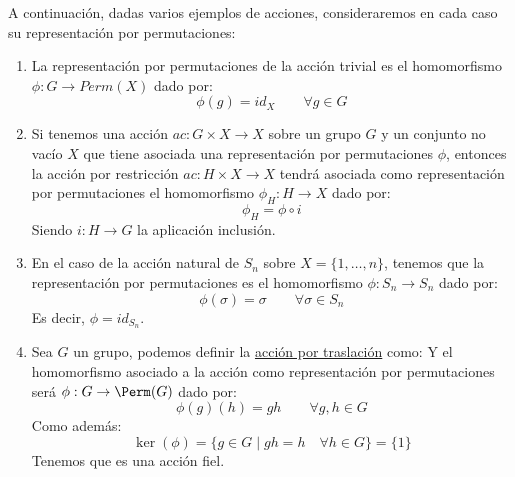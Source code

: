 \begin{ejemplo}
    A continuación, dadas varios ejemplos de acciones, consideraremos en cada caso su representación por permutaciones:
    \begin{enumerate}
        \item La representación por permutaciones de la acción trivial es el homomorfismo $\phi:G\to Perm(X)$ dado por:
            \begin{equation*}
                \phi(g) = id_X \qquad \forall g\in G
            \end{equation*}
        \item Si tenemos una acción $ac:G\times X\to X$ sobre un grupo $G$ y un conjunto no vacío $X$ que tiene asociada una representación por permutaciones $\phi$, entonces la acción por restricción $ac:H\times X\to X$ tendrá asociada como representación por permutaciones el homomorfismo $\phi_H:H\to X$ dado por:
            \begin{equation*}
                \phi_H = \phi \circ i 
            \end{equation*}
            Siendo $i:H\to G$ la aplicación inclusión.
        \item En el caso de la acción natural de $S_n$ sobre $X =\{1,\ldots,n\} $, tenemos que la representación por permutaciones es el homomorfismo $\phi:S_n\to S_n$ dado por:
            \begin{equation*}
                \phi(\sigma) = \sigma \qquad \forall \sigma\in S_n
            \end{equation*}
            Es decir, $\phi = id_{S_n}$.
        \item Sea $G$ un grupo, podemos definir la \underline{acción por traslación} como:
            Y el homomorfismo asociado a la acción como representación por permutaciones será $\phi:G\to \Perm(G)$ dado por:
            \begin{equation*}
                \phi(g)(h) = gh \qquad \forall g,h\in G
            \end{equation*}
            Como además:
            \begin{equation*}
                \ker(\phi) = \{g\in G\mid gh = h \quad \forall h\in G\} = \{1\}
            \end{equation*}
            Tenemos que es una acción fiel.
    \end{enumerate}
\end{ejemplo}

